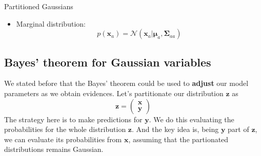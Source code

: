 \begin{frame}{\insertsubsection}
\begin{block}{Partitioned Gaussians}
\begin{itemize}
\item \textcolor{UniGold}{Marginal distribution:}
\begin{equation*}
p\left( \mathbf{x}_a \right) = \mathcal{N} \left( \mathbf{x}_a | \boldsymbol{\mu}_a,\boldsymbol{\Sigma}_{aa} \right)
\end{equation*}
\end{itemize}

\end{block}
\end{frame}


\subsection{Bayes' theorem for Gaussian variables}

\begin{frame}{\insertsubsection}

We stated before that the Bayes' theorem could be used to \textbf{adjust} our model parameters as we obtain evidences. Let's partitionate our distribution $\mathbf{z}$ as 
\begin{equation*}
\mathbf{z} = \begin{pmatrix}
\mathbf{x} \\
\mathbf{y}
\end{pmatrix}
\end{equation*}
The strategy here is to make predictions for $\mathbf{y}$. We do this evaluating the probabilities for the whole distribution $\mathbf{z}$. And the key idea is, being $\mathbf{y}$ part of $\mathbf{z}$, we can evaluate its probabilities from $\mathbf{x}$, assuming that the partionated distributions remains Gaussian.

\end{frame}

